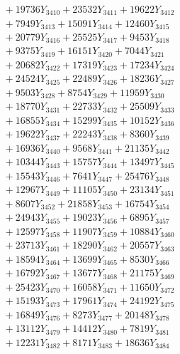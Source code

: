 \documentclass[a4paper,10pt]{article}
\begin{document}
{\begin{align}
&\;  + 19736 Y_{3410} + 23532 Y_{3411} + 19622 Y_{3412} \\[0.3ex]
&\;  + 7949 Y_{3413} + 15091 Y_{3414} + 12460 Y_{3415} \\[0.3ex]
&\;  + 20779 Y_{3416} + 25525 Y_{3417} + 9453 Y_{3418} \\[0.5ex]\allowbreak
&\;  + 9375 Y_{3419} + 16151 Y_{3420} + 7044 Y_{3421} \\[0.3ex]
&\;  + 20682 Y_{3422} + 17319 Y_{3423} + 17234 Y_{3424} \\[0.3ex]
&\;  + 24524 Y_{3425} + 22489 Y_{3426} + 18236 Y_{3427} \\[0.3ex]
&\;  + 9503 Y_{3428} + 8754 Y_{3429} + 11959 Y_{3430} \\[0.3ex]
&\;  + 18770 Y_{3431} + 22733 Y_{3432} + 25509 Y_{3433} \\[0.3ex]
&\;  + 16855 Y_{3434} + 15299 Y_{3435} + 10152 Y_{3436} \\[0.3ex]
&\;  + 19622 Y_{3437} + 22243 Y_{3438} + 8360 Y_{3439} \\[0.3ex]
&\;  + 16936 Y_{3440} + 9568 Y_{3441} + 21135 Y_{3442} \\[0.3ex]
&\;  + 10344 Y_{3443} + 15757 Y_{3444} + 13497 Y_{3445} \\[0.3ex]
&\;  + 15543 Y_{3446} + 7641 Y_{3447} + 25476 Y_{3448} \\[0.5ex]\allowbreak
&\;  + 12967 Y_{3449} + 11105 Y_{3450} + 23134 Y_{3451} \\[0.3ex]
&\;  + 8607 Y_{3452} + 21858 Y_{3453} + 16754 Y_{3454} \\[0.3ex]
&\;  + 24943 Y_{3455} + 19023 Y_{3456} + 6895 Y_{3457} \\[0.3ex]
&\;  + 12597 Y_{3458} + 11907 Y_{3459} + 10884 Y_{3460} \\[0.3ex]
&\;  + 23713 Y_{3461} + 18290 Y_{3462} + 20557 Y_{3463} \\[0.3ex]
&\;  + 18594 Y_{3464} + 13699 Y_{3465} + 8530 Y_{3466} \\[0.3ex]
&\;  + 16792 Y_{3467} + 13677 Y_{3468} + 21175 Y_{3469} \\[0.3ex]
&\;  + 25423 Y_{3470} + 16058 Y_{3471} + 11650 Y_{3472} \\[0.3ex]
&\;  + 15193 Y_{3473} + 17961 Y_{3474} + 24192 Y_{3475} \\[0.3ex]
&\;  + 16849 Y_{3476} + 8273 Y_{3477} + 20148 Y_{3478} \\[0.5ex]\allowbreak
&\;  + 13112 Y_{3479} + 14412 Y_{3480} + 7819 Y_{3481} \\[0.3ex]
&\;  + 12231 Y_{3482} + 8171 Y_{3483} + 18636 Y_{3484} \\[0.3ex]

\end{align}}
\end{document}
